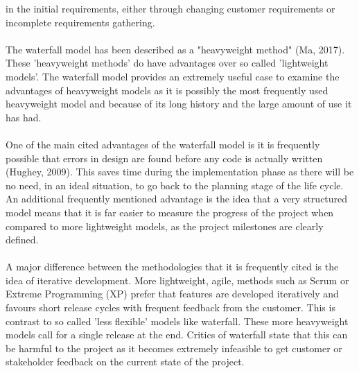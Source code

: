 \documentclass{CRPITStyle}
\begin{document}
		in the initial requirements, either through changing customer requirements or incomplete requirements gathering.\\
		~\\
		The waterfall model has been described as a "heavyweight method" (Ma, 2017). These 'heavyweight methods' 
		do have advantages over so called 'lightweight models'. The waterfall model provides an extremely useful case
		to examine the advantages of heavyweight models as it is possibly the most frequently used heavyweight model
		and because of its long history and the large amount of use it has had. \\
		~\\
		One of the main cited advantages of the waterfall model is it is frequently possible that errors in design are found
		before any code is actually written (Hughey, 2009). This saves time during the implementation phase as 
		there will be no need, in an ideal situation, to go back to the planning stage of the life cycle. An additional frequently 		mentioned advantage is the idea that a very structured model means that it is far easier to measure the progress of the project
		when compared to more lightweight models, as the project milestones are clearly defined.\\
		~\\
		A major difference between the methodologies that it is frequently cited is the idea of iterative development. More 
		lightweight, agile, methods such as Scrum or Extreme Programming (XP) prefer that features are developed iteratively
		and favours short release cycles with frequent feedback from the customer. This is contrast to so called 'less flexible'
		models like waterfall. These more heavyweight models call for a single release at the end. Critics of waterfall state
		that this can be harmful to the project as it becomes extremely infeasible to get customer or stakeholder feedback
		on the current state of the project. 
		
	
	   
\end{document}
